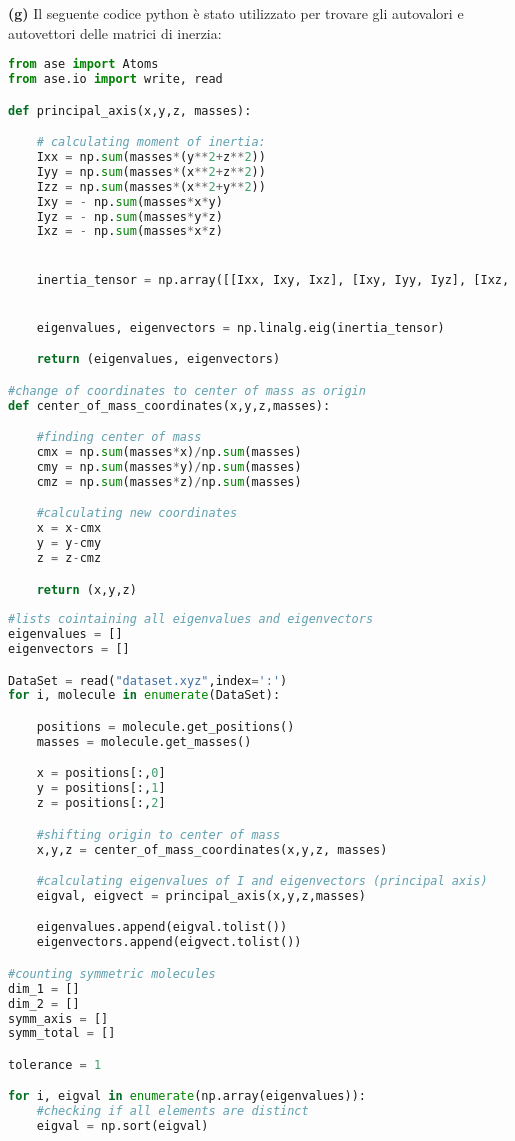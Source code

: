 \documentclass{article}
\begin{document}
\textbf{(g)}
Il seguente codice python è stato utilizzato per trovare gli autovalori e autovettori delle matrici di inerzia:
\begin{lstlisting}[language = Python]
from ase import Atoms
from ase.io import write, read

def principal_axis(x,y,z, masses):

    # calculating moment of inertia:
    Ixx = np.sum(masses*(y**2+z**2))
    Iyy = np.sum(masses*(x**2+z**2))
    Izz = np.sum(masses*(x**2+y**2))
    Ixy = - np.sum(masses*x*y)
    Iyz = - np.sum(masses*y*z)
    Ixz = - np.sum(masses*x*z)


    inertia_tensor = np.array([[Ixx, Ixy, Ixz], [Ixy, Iyy, Iyz], [Ixz, Iyz, Izz]])


    eigenvalues, eigenvectors = np.linalg.eig(inertia_tensor)

    return (eigenvalues, eigenvectors)

#change of coordinates to center of mass as origin
def center_of_mass_coordinates(x,y,z,masses):

    #finding center of mass
    cmx = np.sum(masses*x)/np.sum(masses)
    cmy = np.sum(masses*y)/np.sum(masses)
    cmz = np.sum(masses*z)/np.sum(masses)

    #calculating new coordinates
    x = x-cmx
    y = y-cmy
    z = z-cmz

    return (x,y,z)
    
#lists cointaining all eigenvalues and eigenvectors
eigenvalues = []
eigenvectors = []

DataSet = read("dataset.xyz",index=':')
for i, molecule in enumerate(DataSet):

    positions = molecule.get_positions()
    masses = molecule.get_masses()

    x = positions[:,0]
    y = positions[:,1]
    z = positions[:,2]

    #shifting origin to center of mass
    x,y,z = center_of_mass_coordinates(x,y,z, masses)

    #calculating eigenvalues of I and eigenvectors (principal axis)
    eigval, eigvect = principal_axis(x,y,z,masses)

    eigenvalues.append(eigval.tolist())
    eigenvectors.append(eigvect.tolist())

#counting symmetric molecules
dim_1 = []
dim_2 = []
symm_axis = []
symm_total = []

tolerance = 1

for i, eigval in enumerate(np.array(eigenvalues)):
    #checking if all elements are distinct
    eigval = np.sort(eigval)


\end{lstlisting}
\end{document}
